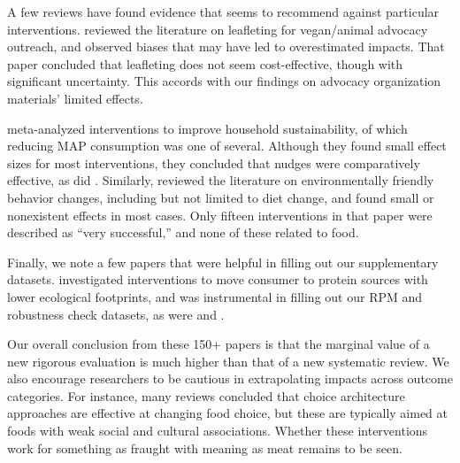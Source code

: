 \documentclass[sn-nature,referee,pdflatex]{sn-jnl}
\begin{document}
A few reviews have found evidence that seems to recommend against
particular interventions. \citep{greig2017} reviewed the literature on
leafleting for vegan/animal advocacy outreach, and observed biases that
may have led to overestimated impacts. That paper concluded that
leafleting does not seem cost-effective, though with significant
uncertainty. This accords with our findings on advocacy organization
materials' limited effects.

\citep{nisa2019} meta-analyzed interventions to improve household
sustainability, of which reducing MAP consumption was one of several.
Although they found small effect sizes for most interventions, they
concluded that nudges were comparatively effective, as did
\citep{ensaff2021}. Similarly, \citep{rau2022} reviewed the literature
on environmentally friendly behavior changes, including but not limited
to diet change, and found small or nonexistent effects in most cases.
Only fifteen interventions in that paper were described as ``very
successful,'' and none of these related to food.

Finally, we note a few papers that were helpful in filling out our
supplementary datasets. \citep{ronto2022} investigated interventions to
move consumer to protein sources with lower ecological footprints, and
was instrumental in filling out our RPM and robustness check datasets,
as were \citep{kwasny2022} and \citep{grummon2023}.

Our overall conclusion from these 150+ papers is that the marginal value
of a new rigorous evaluation is much higher than that of a new
systematic review. We also encourage researchers to be cautious in
extrapolating impacts across outcome categories. For instance, many
reviews concluded that choice architecture approaches are effective at
changing food choice, but these are typically aimed at foods with weak
social and cultural associations. Whether these interventions work for
something as fraught with meaning as meat remains to be seen.

\newpage

\renewcommand\refname{References}

\end{document}
